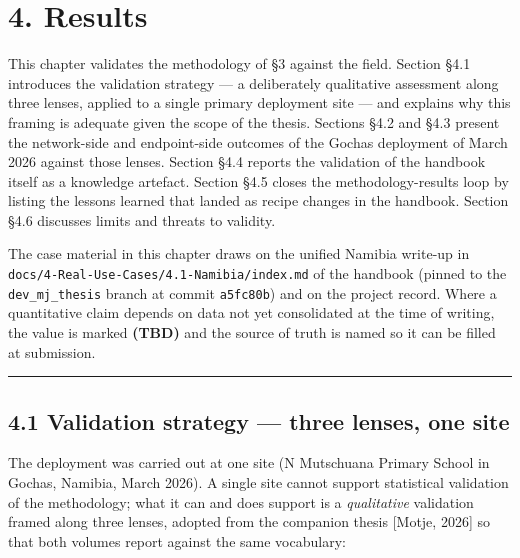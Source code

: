 \hypertarget{results}{%
\section{4. Results}\label{results}}

This chapter validates the methodology of §3 against the field. Section
§4.1 introduces the validation strategy --- a deliberately qualitative
assessment along three lenses, applied to a single primary deployment
site --- and explains why this framing is adequate given the scope of
the thesis. Sections §4.2 and §4.3 present the network-side and
endpoint-side outcomes of the Gochas deployment of March 2026 against
those lenses. Section §4.4 reports the validation of the handbook itself
as a knowledge artefact. Section §4.5 closes the methodology-results
loop by listing the lessons learned that landed as recipe changes in the
handbook. Section §4.6 discusses limits and threats to validity.

The case material in this chapter draws on the unified Namibia write-up
in \texttt{docs/4-Real-Use-Cases/4.1-Namibia/index.md} of the handbook
(pinned to the \texttt{dev\_mj\_thesis} branch at commit
\texttt{a5fc80b}) and on the project record. Where a quantitative claim
depends on data not yet consolidated at the time of writing, the value
is marked \textbf{(TBD)} and the source of truth is named so it can be
filled at submission.

\begin{center}\rule{0.5\linewidth}{0.5pt}\end{center}

\hypertarget{validation-strategy-three-lenses-one-site}{%
\subsection{4.1 Validation strategy --- three lenses, one
site}\label{validation-strategy-three-lenses-one-site}}

The deployment was carried out at one site (N Mutschuana Primary School
in Gochas, Namibia, March 2026). A single site cannot support
statistical validation of the methodology; what it can and does support
is a \emph{qualitative} validation framed along three lenses, adopted
from the companion thesis {[}Motje, 2026{]} so that both volumes report
against the same vocabulary:

